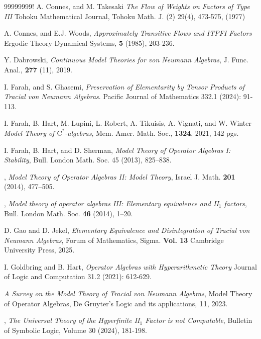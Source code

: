 \documentclass[12pt]{amsart}
\theoremstyle{definition}
\newcommand{\cstar}{$\mathrm{C}^*$}
\begin{document}
\begin{thebibliography}{99999999!}
 A. Connes, and M. Takesaki \emph{The Flow of Weights on Factors of Type III} Tohoku Mathematical Journal, Tohoku Math. J. (2) 29(4), 473-575, (1977)

 A. Connes, and E.J. Woods, \emph{Approximately Transitive Flows and ITPFI Factors} Ergodic Theory Dynamical Systems, {\bf 5} (1985), 203-236.

 Y. Dabrowski, \emph{Continuous Model Theories for von Neumann Algebras}, J. Func. Anal., {\bf 277} (11), 2019.


 I. Farah, and S. Ghasemi, \emph{Preservation of Elementarity by Tensor Products of Tracial von Neumann Algebras}. Pacific Journal of Mathematics 332.1 (2024): 91-113.

 I. Farah, B. Hart, M. Lupini, L. Robert, A. Tikuisis, A. Vignati, and W. Winter \emph{Model Theory of \cstar-algebras}, Mem. Amer. Math. Soc., {\bf 1324}, 2021, 142 pgs.

 I. Farah, B. Hart, and D. Sherman, \emph{Model Theory of Operator Algebras I: Stability}, Bull. London Math. Soc. 45 (2013), 825–838.

  \bysame, \emph{Model Theory of Operator Algebras II:  Model Theory}, Israel J. Math. \textbf{201} (2014), 477--505.

 \bysame, \emph{Model theory of operator algebras III:  Elementary equivalence and II$_1$ factors}, Bull. London Math. Soc. \textbf{46} (2014), 1--20.

 D. Gao and D. Jekel, \emph{Elementary Equivalence and Disintegration of Tracial von Neumann Algebras}, Forum of Mathematics, Sigma. {\bf Vol. 13} Cambridge University Press, 2025.


 I. Goldbring and B. Hart, \emph{Operator Algebras with Hyperarithmetic Theory} Journal of Logic and Computation 31.2 (2021): 612-629.

 \bysame \emph{A Survey on the Model Theory of Tracial von Neumann Algebras}, Model Theory of Operator Algebras, De Gruyter's Logic and its applications, {\bf 11}, 2023.

 \bysame, \emph{The Universal Theory of the Hyperfinite II$_1$ Factor is not Computable}, Bulletin of Symbolic Logic, Volume 30 (2024), 181-198.


\end{thebibliography}
\end{document}
